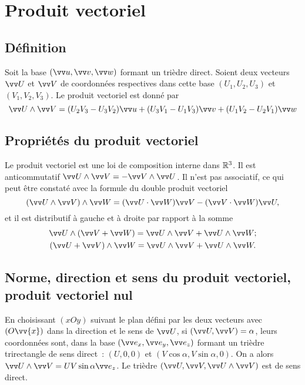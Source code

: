 \section{Produit vectoriel}%
\label{chap1-sec:produitvectoriel}%

\subsection{Définition}%
\label{chap1-subsec:defprodvec}%

Soit la base \((\vu,\vvv,\vw)\) formant un trièdre direct. Soient deux 
vecteurs \(\vU\) et \(\vV\) de coordonnées respectives dans cette base 
\((U_1,U_2,U_3)\) et \((V_1,V_2,V_3)\). Le produit vectoriel est donné par
\begin{equation}%
  \vU \wedge \vV = (U_2V_3-U_3V_2) \vu + (U_3V_1-U_1V_3) \vvv + 
  (U_1V_2-U_2V_1) \vw
\end{equation}%

\subsection{Propriétés du produit vectoriel}%
\label{chap1-subsec:propprodvec}%

Le produit vectoriel est une loi de composition interne dans \(\mathbb{R}^3\). Il est 
anticommutatif \(\vU\wedge\vV=-\vV\wedge\vU\). Il n'est pas associatif, ce qui 
peut être constaté avec la formule du double produit vectoriel
\begin{equation}%
  \label{eq:doubleproduitvectoriel}%
  (\vU\wedge\vV)\wedge\vW=(\vU\cdot\vW)\vV-(\vV\cdot\vW)\vU,
\end{equation}%
et il est distributif à gauche et à droite par rapport à la somme
\begin{gather}%
  \vU\wedge(\vV+\vW)= \vU\wedge\vV + \vU\wedge\vW;\\
  (\vU+\vV)\wedge\vW = \vU\wedge\vV + \vU\wedge\vW.
\end{gather}%

\subsection{Norme, direction et sens du produit vectoriel, produit vectoriel 
nul}\label{chap1-sec:normedirectionetsensproduitvectoriel}%

En choisissant \((xOy)\) suivant le plan défini par les deux vecteurs avec 
\((O\vv{x})\) dans la direction et le sens de \(\vU\), si 
\((\vU,\vV)=\alpha\), leurs coordonnées sont, dans la base \((\ex,\ey,\ez)\) 
formant un trièdre trirectangle de sens direct~: \((U,0,0)\) et 
\((V\cos\alpha,V\sin\alpha,0)\). 
On a alors \(\vU\wedge\vV = UV\sin\alpha\ez\). Le trièdre 
\((\vU,\vV,\vU\wedge\vV)\) est de sens direct.

